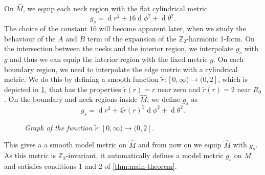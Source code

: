 \documentclass[preprint,12pt]{elsarticle}
\numberwithin{table}{section}
\newcommand{\Z}{\mathbb{Z}}
\renewcommand{\d}{\operatorname{d}\!}
\begin{document}
On $\hat{M}$, we equip each neck region with the flat cylindrical metric 
\begin{equation}
	\label{eq:metric-neck-region}
	g_s = \d r^2 + 16 \d \phi^2 + \d \theta^2.
\end{equation}
The choice of the constant $16$ will become apparent later, when we study the behaviour of the $A$ and $B$ term of the expansion of the $\Z_2$-harmonic 1-form.
On the intersection between the necks and the interior region, we interpolate $g_s$ with $g$ and thus we can equip the interior region with the fixed metric $g$. On each boundary region, we need to interpolate the edge metric with a cylindrical metric. We do this by defining a smooth function $\tilde r\colon [0, \infty) \to (0, 2]$, which is depicted in \cref{fig:graph-of-tilde-r}, that has the properties $\tilde r(r) = r$ near zero and $\tilde r(r) = 2$ near $R_0$. On the boundary and neck regions inside $\hat{M}$, we define $g_s$ as 
$$
g_s = \d r^2 + 4 \tilde r(r)^2 \d \phi^2 + \d \theta^2.
$$

\begin{figure}[ht!]
	\centering
	\caption{\textit{Graph of the function $\tilde r\colon [0, \infty) \to (0, 2]$.}}
	\label{fig:graph-of-tilde-r}
\end{figure}

This gives a a smooth model metric on $\hat{M}$ and from now on we equip $\hat{M}$ with $g_s$. As this metric is $\Z_2$-invariant, it automatically defines a model metric $g_s$ on $M$ and satisfies conditions 1 and 2 of \cref{thm:main-theorem}.
\end{document}
